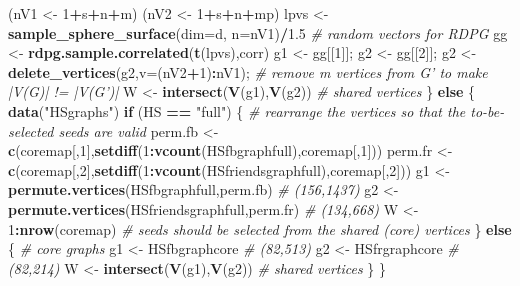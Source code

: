 \documentclass[
]{article}
\newenvironment{Shaded}{\begin{snugshade}}{\end{snugshade}}
\newcommand{\CommentTok}[1]{\textcolor[rgb]{0.56,0.35,0.01}{\textit{#1}}}
\newcommand{\ControlFlowTok}[1]{\textcolor[rgb]{0.13,0.29,0.53}{\textbf{#1}}}
\newcommand{\DataTypeTok}[1]{\textcolor[rgb]{0.13,0.29,0.53}{#1}}
\newcommand{\DecValTok}[1]{\textcolor[rgb]{0.00,0.00,0.81}{#1}}
\newcommand{\FloatTok}[1]{\textcolor[rgb]{0.00,0.00,0.81}{#1}}
\newcommand{\KeywordTok}[1]{\textcolor[rgb]{0.13,0.29,0.53}{\textbf{#1}}}
\newcommand{\NormalTok}[1]{#1}
\newcommand{\OperatorTok}[1]{\textcolor[rgb]{0.81,0.36,0.00}{\textbf{#1}}}
\newcommand{\StringTok}[1]{\textcolor[rgb]{0.31,0.60,0.02}{#1}}
\begin{document}
\begin{Shaded}
\begin{Highlighting}[]
\NormalTok{    (nV1 <-}\StringTok{ }\DecValTok{1}\OperatorTok{+}\NormalTok{s}\OperatorTok{+}\NormalTok{n}\OperatorTok{+}\NormalTok{m)}
\NormalTok{    (nV2 <-}\StringTok{ }\DecValTok{1}\OperatorTok{+}\NormalTok{s}\OperatorTok{+}\NormalTok{n}\OperatorTok{+}\NormalTok{mp)}
\NormalTok{    lpvs <-}\StringTok{ }\KeywordTok{sample_sphere_surface}\NormalTok{(}\DataTypeTok{dim=}\NormalTok{d, }\DataTypeTok{n=}\NormalTok{nV1)}\OperatorTok{/}\FloatTok{1.5} \CommentTok{# random vectors for RDPG}
\NormalTok{    gg <-}\StringTok{ }\KeywordTok{rdpg.sample.correlated}\NormalTok{(}\KeywordTok{t}\NormalTok{(lpvs),corr)}
\NormalTok{    g1 <-}\StringTok{ }\NormalTok{gg[[}\DecValTok{1}\NormalTok{]]; }
\NormalTok{    g2 <-}\StringTok{ }\NormalTok{gg[[}\DecValTok{2}\NormalTok{]]; }
\NormalTok{    g2 <-}\StringTok{ }\KeywordTok{delete_vertices}\NormalTok{(g2,}\DataTypeTok{v=}\NormalTok{(nV2}\OperatorTok{+}\DecValTok{1}\NormalTok{)}\OperatorTok{:}\NormalTok{nV1); }\CommentTok{# remove m vertices from G' to make |V(G)| != |V(G')|}
\NormalTok{    W <-}\StringTok{ }\KeywordTok{intersect}\NormalTok{(}\KeywordTok{V}\NormalTok{(g1),}\KeywordTok{V}\NormalTok{(g2)) }\CommentTok{# shared vertices}
\NormalTok{\} }\ControlFlowTok{else}\NormalTok{ \{}
    \KeywordTok{data}\NormalTok{(}\StringTok{"HSgraphs"}\NormalTok{)}
    \ControlFlowTok{if}\NormalTok{ (HS }\OperatorTok{==}\StringTok{ "full"}\NormalTok{) \{}
        \CommentTok{# rearrange the vertices so that the to-be-selected seeds are valid}
\NormalTok{        perm.fb <-}\StringTok{ }\KeywordTok{c}\NormalTok{(coremap[,}\DecValTok{1}\NormalTok{],}\KeywordTok{setdiff}\NormalTok{(}\DecValTok{1}\OperatorTok{:}\KeywordTok{vcount}\NormalTok{(HSfbgraphfull),coremap[,}\DecValTok{1}\NormalTok{]))}
\NormalTok{        perm.fr <-}\StringTok{ }\KeywordTok{c}\NormalTok{(coremap[,}\DecValTok{2}\NormalTok{],}\KeywordTok{setdiff}\NormalTok{(}\DecValTok{1}\OperatorTok{:}\KeywordTok{vcount}\NormalTok{(HSfriendsgraphfull),coremap[,}\DecValTok{2}\NormalTok{]))}
\NormalTok{        g1 <-}\StringTok{ }\KeywordTok{permute.vertices}\NormalTok{(HSfbgraphfull,perm.fb) }\CommentTok{# (156,1437)}
\NormalTok{        g2 <-}\StringTok{ }\KeywordTok{permute.vertices}\NormalTok{(HSfriendsgraphfull,perm.fr) }\CommentTok{# (134,668)}
\NormalTok{        W <-}\StringTok{ }\DecValTok{1}\OperatorTok{:}\KeywordTok{nrow}\NormalTok{(coremap) }\CommentTok{# seeds should be selected from the shared (core) vertices}
\NormalTok{    \} }\ControlFlowTok{else}\NormalTok{ \{ }\CommentTok{# core graphs}
\NormalTok{        g1 <-}\StringTok{ }\NormalTok{HSfbgraphcore }\CommentTok{# (82,513)}
\NormalTok{        g2 <-}\StringTok{ }\NormalTok{HSfrgraphcore }\CommentTok{# (82,214)}
\NormalTok{        W <-}\StringTok{ }\KeywordTok{intersect}\NormalTok{(}\KeywordTok{V}\NormalTok{(g1),}\KeywordTok{V}\NormalTok{(g2)) }\CommentTok{# shared vertices}
\NormalTok{    \}}
\NormalTok{\}}
\end{Highlighting}
\end{Shaded}
\end{document}
